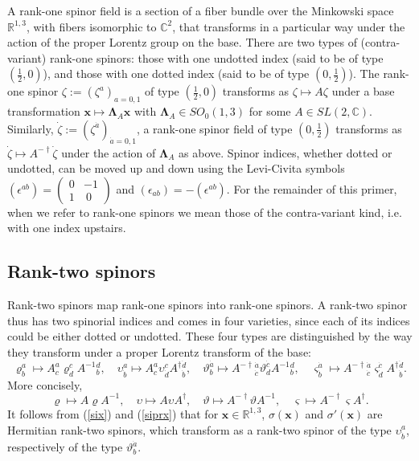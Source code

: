 \documentclass[12pt]{article}
\theoremstyle{definition}
\newcommand{\refeq}[1]{(\ref{#1})}
\numberwithin{equation}{section}
\newcommand{\bx}{\mathbf{x}}
\newcommand{\beq}{\begin{equation}}
\newcommand{\eeq}{\end{equation}}
\newcommand{\bLa}{\boldsymbol{\Lambda}}
\newcommand{\Cset}{{\mathbb C}}
\newcommand{\Rset}{{\mathbb R}}
\newcommand{\ep}{\epsilon}
\newcommand{\si}{\sigma}
\newcommand{\half}{\frac{1}{2}}
\begin{document}
 A rank-one spinor field is a section of a fiber bundle over the Minkowski space $\Rset^{1,3}$, with fibers isomorphic to $\Cset^2$, 
that transforms in a particular way under the action of the proper Lorentz group on the base.
  There are two types of (contra-variant) rank-one spinors: those with one undotted index (said to be of type $(\half,0)$), and those 
with one dotted index (said to be of type $(0,\half)$).
 The rank-one spinor $\zeta := (\zeta^a)_{a=0,1}$ of type $(\half,0)$ transforms as $\zeta \mapsto A\zeta$ 
under a base transformation $\bx \mapsto \bLa_A \bx$ with $\bLa_A \in SO_0(1,3)$ for some $A\in SL(2,\Cset)$.
 Similarly, $\dot\zeta := (\zeta^{\dot{a}})_{\dot{a}=0,1}$, a rank-one spinor field of type $(0,\half)$ 
transforms as $\dot\zeta \mapsto A^{-\dagger}\dot\zeta$ under the action of $\bLa_A$ as above.
 Spinor indices, whether dotted or undotted, can be moved up and down using the Levi-Civita symbols 
$(\ep^{ab}) = \left(\begin{array}{cc} 0 & -1\\ 1 & \ 0\end{array}\right)$ and $(\ep_{ab}) = -(\ep^{ab})$.
 For the remainder of this primer, when we refer to rank-one spinors we mean those of the contra-variant kind, i.e. with one index upstairs.


\subsection{Rank-two spinors}

 Rank-two spinors map rank-one spinors into rank-one spinors. 
 A rank-two spinor thus has two spinorial indices and comes in four varieties, since each of its indices could be either dotted or 
undotted. 
 These four types are distinguished by the way they transform under a proper Lorentz transform of the base: 
\beq 
\varrho^a_b 
 \mapsto  A^a_c \varrho^c_d A^{-1}{}^d_b, \quad
\upsilon^a_{\dot{b}} \mapsto  A^a_c \upsilon^c_{\dot{d}} A^\dag{}^{\dot{d}}_{\dot{b}}, \quad
\vartheta^{\dot{a}}_b \mapsto  A^{-\dag}{}^{\dot{a}}_{\dot{c}} \vartheta^{\dot{c}}_d A^{-1}{}^d_b, \quad
\varsigma^{\dot{a}}_{\dot{b}}  
\mapsto  A^{-\dag}{}^{\dot{a}}_{\dot{c}} \varsigma^{\dot{c}}_{\dot{d}} A^\dag{}^{\dot{d}}_{\dot{b}}.
\eeq
 More concisely,
\beq \label{transrules}
\varrho  \mapsto  A \varrho A^{-1}, \quad
\upsilon \mapsto  A \upsilon A^\dag{}, \quad
\vartheta \mapsto  A^{-\dag}\vartheta A^{-1}, \quad
\varsigma \mapsto  A^{-\dag}\varsigma A^\dag{}.
\eeq
 It follows from \refeq{six} and \refeq{siprx} that for $\bx\in\Rset^{1,3}$, $\si(\bx)$ and $\si'(\bx)$ are Hermitian rank-two spinors,
which transform as a rank-two spinor of the type $\upsilon^a_{\dot{b}}$, respectively 
of the type $\vartheta^{\dot{a}}_b$. 
\end{document}
